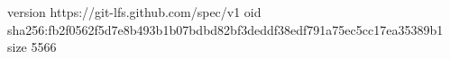 version https://git-lfs.github.com/spec/v1
oid sha256:fb2f0562f5d7e8b493b1b07bdbd82bf3deddf38edf791a75ec5cc17ea35389b1
size 5566
